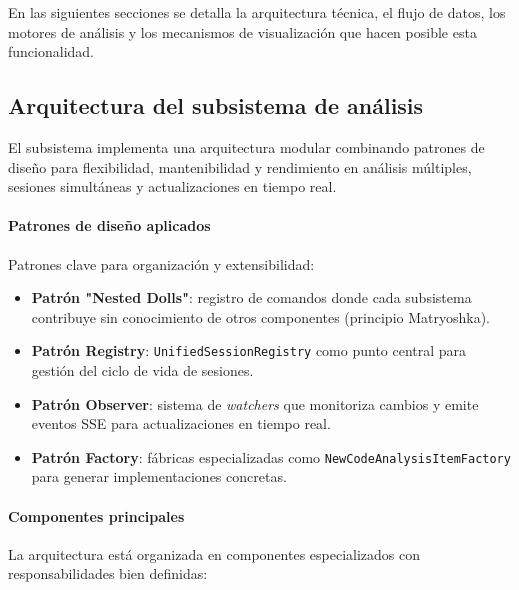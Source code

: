\documentclass[a4paper, 12pt]{book}
\begin{document}
En las siguientes secciones se detalla la arquitectura técnica, el flujo de datos, los motores de análisis y los mecanismos de visualización que hacen posible esta funcionalidad.

\subsection{Arquitectura del subsistema de análisis}
\label{sec:arquitectura-analisis}

El subsistema implementa una arquitectura modular combinando patrones de diseño para flexibilidad, mantenibilidad y rendimiento en análisis múltiples, sesiones simultáneas y actualizaciones en tiempo real.

\paragraph{Patrones de diseño aplicados}
Patrones clave para organización y extensibilidad:

\begin{itemize}
  \item \textbf{Patrón "Nested Dolls"}: registro de comandos donde cada subsistema contribuye sin conocimiento de otros componentes (principio Matryoshka).
  \item \textbf{Patrón Registry}: \texttt{UnifiedSessionRegistry} como punto central para gestión del ciclo de vida de sesiones.
  \item \textbf{Patrón Observer}: sistema de \emph{watchers} que monitoriza cambios y emite eventos SSE para actualizaciones en tiempo real.
  \item \textbf{Patrón Factory}: fábricas especializadas como \texttt{NewCodeAnalysisItemFactory} para generar implementaciones concretas.
\end{itemize}

\paragraph{Componentes principales}
La arquitectura está organizada en componentes especializados con responsabilidades bien definidas:
\end{document}
